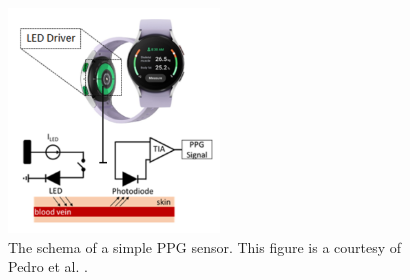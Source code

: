 \begin{figure}
	\centering
	\includegraphics[width=0.5\textwidth]{img/ppg.png}
	\caption{The schema of a simple \gls{PPG} sensor. This figure is a courtesy of Pedro et al. \cite{deep-learning-3}.}
	\label{fig:method:ppg}
\end{figure}
